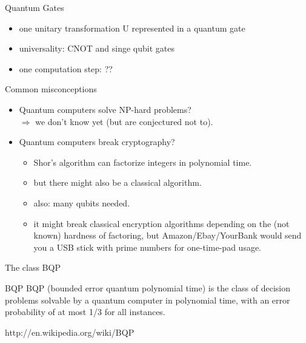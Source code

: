 \documentclass[c]{beamer}
\begin{document}
\begin{frame}{Quantum Gates}
\begin{itemize}
\item one unitary transformation U represented in a quantum gate
\item universality: CNOT and singe qubit gates
\item one computation step: ??
\end{itemize}
\end{frame}


\begin{frame}{Common misconceptions}
\begin{itemize}
\item Quantum computers solve NP-hard problems? \\
$\Rightarrow$ we don't know yet (but are conjectured not to).
\item Quantum computers break cryptography? \\
\begin{itemize}
\item Shor's algorithm can factorize integers in polynomial time.
\item but there might also be a classical algorithm.
\item also: many qubits needed.
\item it might break classical encryption algorithms depending on the (not known) hardness of factoring, but Amazon/Ebay/YourBank would send you a USB stick with prime numbers for one-time-pad usage.
\end{itemize}
\end{itemize}
\end{frame}

\begin{frame}{The class BQP}
	\begin{block}{BQP}
		BQP (bounded error quantum polynomial time) is the class of decision problems solvable by a quantum computer in polynomial time, with an error probability of at most 1/3 for all instances.
	\end{block}
	http://en.wikipedia.org/wiki/BQP
\end{frame}
\end{document}
